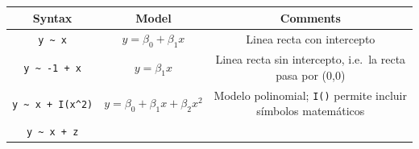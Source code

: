 \documentclass[]{article}
\numberwithin{equation}{section}
\begin{document}
\begin{longtable}[]{@{}ccc@{}}
\toprule
\begin{minipage}[b]{0.14\columnwidth}\centering\strut
Syntax\strut
\end{minipage} & \begin{minipage}[b]{0.29\columnwidth}\centering\strut
Model\strut
\end{minipage} & \begin{minipage}[b]{0.48\columnwidth}\centering\strut
Comments\strut
\end{minipage}\tabularnewline
\midrule
\endhead
\begin{minipage}[t]{0.14\columnwidth}\centering\strut
\texttt{y\ \textasciitilde{}\ x}\strut
\end{minipage} & \begin{minipage}[t]{0.29\columnwidth}\centering\strut
\(y = \beta_0+\beta_1x\)\strut
\end{minipage} & \begin{minipage}[t]{0.48\columnwidth}\centering\strut
Linea recta con intercepto\strut
\end{minipage}\tabularnewline
\begin{minipage}[t]{0.14\columnwidth}\centering\strut
\texttt{y\ \textasciitilde{}\ -1\ +\ x}\strut
\end{minipage} & \begin{minipage}[t]{0.29\columnwidth}\centering\strut
\(y = \beta_1x\)\strut
\end{minipage} & \begin{minipage}[t]{0.48\columnwidth}\centering\strut
Linea recta sin intercepto, i.e.~la recta pasa por (0,0)\strut
\end{minipage}\tabularnewline
\begin{minipage}[t]{0.14\columnwidth}\centering\strut
\texttt{y\ \textasciitilde{}\ x\ +\ I(x\^{}2)}\strut
\end{minipage} & \begin{minipage}[t]{0.29\columnwidth}\centering\strut
\(y = \beta_0+\beta_1x+\beta_2x^2\)\strut
\end{minipage} & \begin{minipage}[t]{0.48\columnwidth}\centering\strut
Modelo polinomial; \texttt{I()} permite incluir símbolos
matemáticos\strut
\end{minipage}\tabularnewline
\begin{minipage}[t]{0.14\columnwidth}\centering\strut
\texttt{y\ \textasciitilde{}\ x\ +\ z}\strut
\end{minipage} & \begin{minipage}[t]{0.29\columnwidth}\centering\strut

\end{minipage}
\end{longtable}
\end{document}
